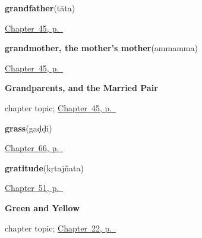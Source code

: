 \noindent\begin{minipage}[t]{\linewidth}
\raggedright
\textbf{grandfather}\enspace\emph{}\enspace(tāta)\par
\footnotesize \hyperref[ch:te-grandparents]{Chapter~45, p.~\pageref*{ch:te-grandparents}}
\end{minipage}\par\smallskip

\noindent\begin{minipage}[t]{\linewidth}
\raggedright
\textbf{grandmother, the mother's mother}\enspace\emph{}\enspace(ammamma)\par
\footnotesize \hyperref[ch:te-grandparents]{Chapter~45, p.~\pageref*{ch:te-grandparents}}
\end{minipage}\par\smallskip

\noindent\begin{minipage}[t]{\linewidth}
\raggedright
\textbf{Grandparents, and the Married Pair}\par
\footnotesize chapter topic; \hyperref[ch:te-grandparents]{Chapter~45, p.~\pageref*{ch:te-grandparents}}
\end{minipage}\par\smallskip

\noindent\begin{minipage}[t]{\linewidth}
\raggedright
\textbf{grass}\enspace\emph{}\enspace(gaḍḍi)\par
\footnotesize \hyperref[ch:te-the-field]{Chapter~66, p.~\pageref*{ch:te-the-field}}
\end{minipage}\par\smallskip

\noindent\begin{minipage}[t]{\linewidth}
\raggedright
\textbf{gratitude}\enspace\emph{}\enspace(kṛtajñata)\par
\footnotesize \hyperref[ch:te-courtesy]{Chapter~51, p.~\pageref*{ch:te-courtesy}}
\end{minipage}\par\smallskip

\noindent\begin{minipage}[t]{\linewidth}
\raggedright
\textbf{Green and Yellow}\par
\footnotesize chapter topic; \hyperref[ch:te-green-and-yellow]{Chapter~22, p.~\pageref*{ch:te-green-and-yellow}}
\end{minipage}\par\smallskip

